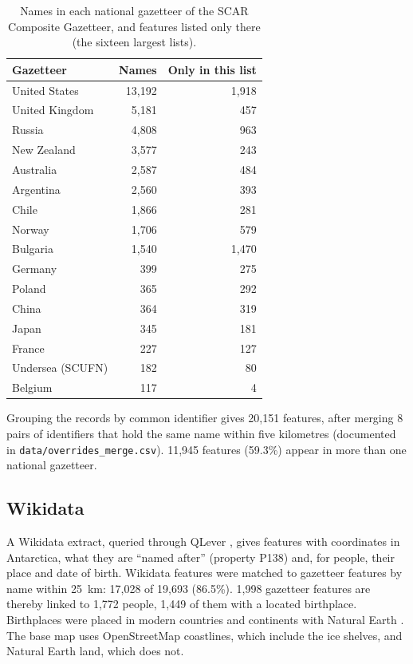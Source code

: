 \documentclass[11pt,a4paper]{article}
\begin{document}
\begin{table}[tbp]\centering\small\caption{Names in each national gazetteer of the SCAR Composite Gazetteer, and features listed only there (the sixteen largest lists).}\label{tab:gaz}\begin{tabular}{lrr}\toprule Gazetteer & Names & Only in this list\\\midrule
United States & 13,192 & 1,918\\
United Kingdom & 5,181 & 457\\
Russia & 4,808 & 963\\
New Zealand & 3,577 & 243\\
Australia & 2,587 & 484\\
Argentina & 2,560 & 393\\
Chile & 1,866 & 281\\
Norway & 1,706 & 579\\
Bulgaria & 1,540 & 1,470\\
Germany & 399 & 275\\
Poland & 365 & 292\\
China & 364 & 319\\
Japan & 345 & 181\\
France & 227 & 127\\
Undersea (SCUFN) & 182 & 80\\
Belgium & 117 & 4\\
\bottomrule\end{tabular}\end{table}

Grouping the records by common identifier gives 20,151 features, after merging 8 pairs of identifiers that hold the same name within five kilometres (documented in \texttt{data/overrides\_merge.csv}). 11,945 features (59.3\%) appear in more than one national gazetteer.

\subsection{Wikidata}
A Wikidata \citep{wikidata} extract, queried through QLever \citep{qlever}, gives features with coordinates in Antarctica, what they are ``named after'' (property P138) and, for people, their place and date of birth. Wikidata features were matched to gazetteer features by name within 25~km: 17,028 of 19,693 (86.5\%). 1,998 gazetteer features are thereby linked to 1,772 people, 1,449 of them with a located birthplace. Birthplaces were placed in modern countries and continents with Natural Earth \citep{naturalearth}. The base map uses OpenStreetMap \citep{osm} coastlines, which include the ice shelves, and Natural Earth land, which does not.
\end{document}
